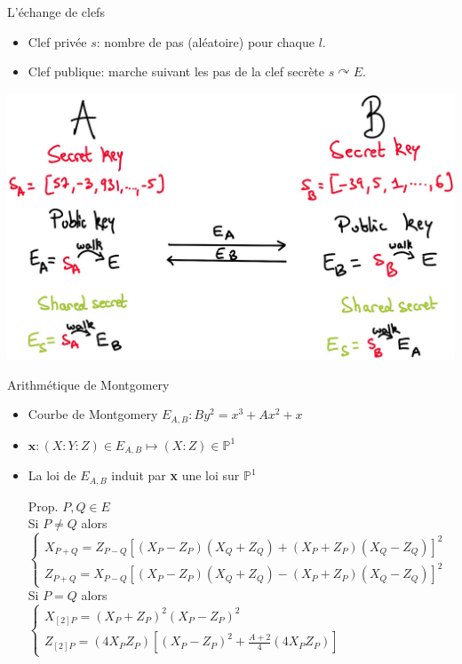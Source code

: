 \documentclass{beamer}
\begin{document}
\begin{frame}{L'\'echange de clefs}
	\begin{itemize}
		\item Clef priv\'ee $s$: nombre de pas (al\'eatoire) pour chaque $l$.
		\item Clef publique: marche suivant les pas de la clef secr\`ete $s\curvearrowright E$.
	\end{itemize}
\begin{center}
	\includegraphics[scale=0.2]{../figs/DH}
\end{center}
\end{frame}

\newcommand{\x}{\textbf{x}}
\begin{frame}{Arithmétique de Montgomery}
	\begin{itemize}
		\item{ Courbe de Montgomery $E_{A,B} : By^2 = x^3+Ax^2 + x$}
		\item{ $\x\colon (X:Y:Z) \in E_{A,B} \mapsto (X:Z) \in \mathbb{P}^1$}
		\item{La loi de $E_{A,B}$ induit par {\x} une loi sur $\mathbb{P}^1$}
		\item[Prop.]{$P,Q\in E$\\ \hspace{-20pt}
			Si $P\neq Q$ alors\\
			{\small$\left\{\begin{array}{l}
					X_{P+Q} = Z_{P-Q}[(X_P-Z_P)(X_Q+Z_Q) + (X_P+Z_P)(X_Q-Z_Q)]^2\\
					Z_{P+Q} = X_{P-Q}[(X_P-Z_P)(X_Q+Z_Q) - (X_P+Z_P)(X_Q-Z_Q)]^2
				\end{array}\right.$}\\ \hspace{-20pt}
			Si $P=Q$ alors\\
			{\small$\left\{\begin{array}{l}
					X_{[2]P}=(X_P + Z_P)^2(X_P - Z_P)^2 \\
					Z_{[2]P}=(4 X_P Z_P)[(X_P - Z_P)^2 + \frac{A+2}{4}(4 X_P Z_P)]
				\end{array}\right.$}}
\end{itemize}\end{frame}
\end{document}
